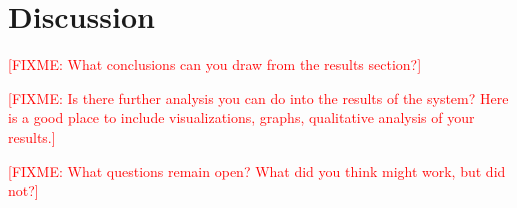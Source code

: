 \documentclass{article}
\newcommand{\fixme}[1]{\textcolor{red}{[FIXME: #1]}}
\begin{document}




\section{Discussion}
\label{sec:discussion}

\fixme{What conclusions can you draw from the results section?}

\fixme{Is there further analysis you can do into the results of the system? Here is a good place to include visualizations, graphs, qualitative analysis of your results.}

\fixme{What questions remain open? What did you think might work, but did not?}
\end{document}
